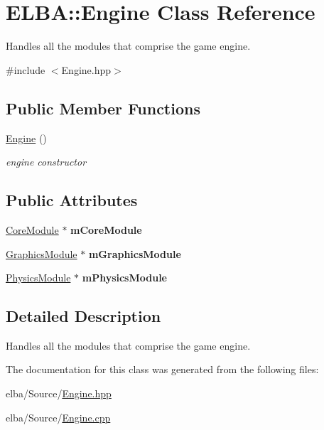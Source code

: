 \hypertarget{class_e_l_b_a_1_1_engine}{}\section{E\+L\+BA\+:\+:Engine Class Reference}
\label{class_e_l_b_a_1_1_engine}


Handles all the modules that comprise the game engine.  




{\ttfamily \#include $<$Engine.\+hpp$>$}

\subsection*{Public Member Functions}
\begin{DoxyCompactItemize}
\item 
\mbox{\label{class_e_l_b_a_1_1_engine_a9f205a0bef747c264ac44d9185ffdbf8}} 
\mbox{\hyperlink{class_e_l_b_a_1_1_engine_a9f205a0bef747c264ac44d9185ffdbf8}{Engine}} ()
\begin{DoxyCompactList}\small\item\em engine constructor \end{DoxyCompactList}\end{DoxyCompactItemize}
\subsection*{Public Attributes}
\begin{DoxyCompactItemize}
\item 
\mbox{\label{class_e_l_b_a_1_1_engine_a59fa1c9205d09499bdfd0718815479cf}} 
\mbox{\hyperlink{class_e_l_b_a_1_1_core_module}{Core\+Module}} $\ast$ {\bfseries m\+Core\+Module}
\item 
\mbox{\label{class_e_l_b_a_1_1_engine_af83374c056e6d336d5dfd177b8bead23}} 
\mbox{\hyperlink{class_e_l_b_a_1_1_graphics_module}{Graphics\+Module}} $\ast$ {\bfseries m\+Graphics\+Module}
\item 
\mbox{\label{class_e_l_b_a_1_1_engine_a2658d7a20eb44ff57c8ace3901deb11b}} 
\mbox{\hyperlink{class_e_l_b_a_1_1_physics_module}{Physics\+Module}} $\ast$ {\bfseries m\+Physics\+Module}
\end{DoxyCompactItemize}


\subsection{Detailed Description}
Handles all the modules that comprise the game engine. 

The documentation for this class was generated from the following files\+:\begin{DoxyCompactItemize}
\item 
elba/\+Source/\mbox{\hyperlink{_engine_8hpp}{Engine.\+hpp}}\item 
elba/\+Source/\mbox{\hyperlink{_engine_8cpp}{Engine.\+cpp}}\end{DoxyCompactItemize}
